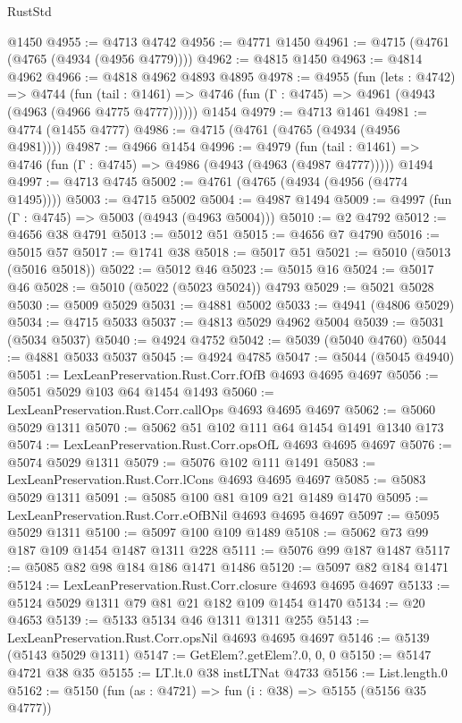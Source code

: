 \begin{lexlean}{RustStd}
\begin{coremodule}
{\begin{coremodule}
{{{{{{{{{{{{{{{{{{{{{{{{{{{{{{    @1450
@4955 := @4713 @4742
@4956 := @4771 @1450
@4961 := @4715 (@4761 (@4765 (@4934 (@4956 @4779))))
@4962 := @4815 @1450
@4963 := @4814 @4962
@4966 := @4818 @4962 @4893 @4895
@4978 := @4955
    (fun (lets : @4742) =>
    @4744
      (fun (tail : @1461) => @4746 (fun (Γ : @4745) => @4961 (@4943 (@4963 (@4966 @4775 @4777))))))
    @1454
@4979 := @4713 @1461
@4981 := @4774 (@1455 @4777)
@4986 := @4715 (@4761 (@4765 (@4934 (@4956 @4981))))
@4987 := @4966 @1454
@4996 := @4979
    (fun (tail : @1461) => @4746 (fun (Γ : @4745) => @4986 (@4943 (@4963 (@4987 @4777)))))
    @1494
@4997 := @4713 @4745
@5002 := @4761 (@4765 (@4934 (@4956 (@4774 @1495))))
@5003 := @4715 @5002
@5004 := @4987 @1494
@5009 := @4997 (fun (Γ : @4745) => @5003 (@4943 (@4963 @5004)))
@5010 := @2 @4792
@5012 := @4656 @38 @4791
@5013 := @5012 @51
@5015 := @4656 @7 @4790
@5016 := @5015 @57
@5017 := @1741 @38
@5018 := @5017 @51
@5021 := @5010 (@5013 (@5016 @5018))
@5022 := @5012 @46
@5023 := @5015 @16
@5024 := @5017 @46
@5028 := @5010 (@5022 (@5023 @5024)) @4793
@5029 := @5021 @5028
@5030 := @5009 @5029
@5031 := @4881 @5002
@5033 := @4941 (@4806 @5029)
@5034 := @4715 @5033
@5037 := @4813 @5029 @4962 @5004
@5039 := @5031 (@5034 @5037)
@5040 := @4924 @4752
@5042 := @5039 (@5040 @4760)
@5044 := @4881 @5033 @5037
@5045 := @4924 @4785
@5047 := @5044 (@5045 @4940)
@5051 := LexLeanPreservation.Rust.Corr.fOfB @4693 @4695 @4697
@5056 := @5051 @5029 @103 @64 @1454 @1493
@5060 := LexLeanPreservation.Rust.Corr.callOps @4693 @4695 @4697
@5062 := @5060 @5029 @1311
@5070 := @5062 @51 @102 @111 @64 @1454 @1491 @1340 @173
@5074 := LexLeanPreservation.Rust.Corr.opsOfL @4693 @4695 @4697
@5076 := @5074 @5029 @1311
@5079 := @5076 @102 @111 @1491
@5083 := LexLeanPreservation.Rust.Corr.lCons @4693 @4695 @4697
@5085 := @5083 @5029 @1311
@5091 := @5085 @100 @81 @109 @21 @1489 @1470
@5095 := LexLeanPreservation.Rust.Corr.eOfBNil @4693 @4695 @4697
@5097 := @5095 @5029 @1311
@5100 := @5097 @100 @109 @1489
@5108 := @5062 @73 @99 @187 @109 @1454 @1487 @1311 @228
@5111 := @5076 @99 @187 @1487
@5117 := @5085 @82 @98 @184 @186 @1471 @1486
@5120 := @5097 @82 @184 @1471
@5124 := LexLeanPreservation.Rust.Corr.closure @4693 @4695 @4697
@5133 := @5124 @5029 @1311 @79 @81 @21 @182 @109 @1454 @1470
@5134 := @20 @4653
@5139 := @5133 @5134 @46 @1311 @1311 @255
@5143 := LexLeanPreservation.Rust.Corr.opsNil @4693 @4695 @4697
@5146 := @5139 (@5143 @5029 @1311)
@5147 := GetElem?.getElem?.{0, 0, 0}
@5150 := @5147 @4721 @38 @35
@5155 := LT.lt.{0} @38 instLTNat @4733
@5156 := List.length.{0}
@5162 := @5150 (fun (as : @4721) => fun (i : @38) => @5155 (@5156 @35 @4777))
}}}}}}}}}}}}}}}}}}}}}}}}}}}}}}
\end{coremodule}}
\end{coremodule}
\end{lexlean}
